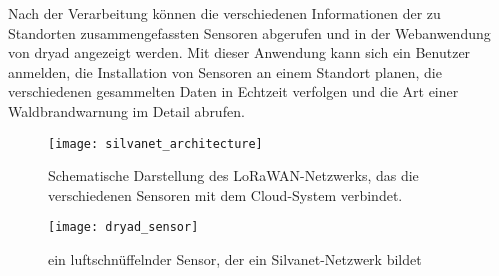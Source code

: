 Nach der Verarbeitung können die verschiedenen Informationen der zu Standorten zusammengefassten Sensoren abgerufen und in der Webanwendung von dryad angezeigt werden.
Mit dieser Anwendung kann sich ein Benutzer anmelden, die Installation von Sensoren an einem Standort planen, die verschiedenen gesammelten Daten in Echtzeit verfolgen und die Art einer Waldbrandwarnung im Detail abrufen.

\begin{figure}[h]
  \centering
  \texttt{[image: silvanet\_architecture]}
  \caption{Schematische Darstellung des LoRaWAN-Netzwerks, das die verschiedenen Sensoren mit dem Cloud-System verbindet.}
\end{figure}


\begin{figure}[h]
  \centering
  \texttt{[image: dryad\_sensor]}
  \caption{ein luftschnüffelnder Sensor, der ein Silvanet-Netzwerk bildet}
\end{figure}

